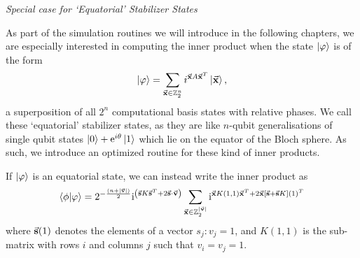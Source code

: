 \large{\itshape{Special case for `Equatorial' Stabilizer States}}\par
As part of the simulation routines we will introduce in the following chapters, we are especially interested in computing the inner product when the state $\ket{\varphi}$ is of the form
\[\ket{\varphi} = \sum_{\va{x}\in\mathbb{Z}_{2}^{n}}i^{\va{x}A\va{x}^{T}}\ket{\va{x}},\]
a superposition of all $2^{n}$ computational basis states with relative phases. We call these `equatorial' stabilizer states, as they are like $n$-qubit generalisations of single qubit states $\ket{0}+\mathrm{e}^{i\theta}\ket{1}$ which lie on the equator of the Bloch sphere. As such, we introduce an optimized routine for these kind of inner products.
\begin{cla}
If $\ket{\varphi}$ is an equatorial state, we can instead write the inner product as
\begin{equation}
\braket{\phi}{\varphi} = 2^{-\frac{(n+\vert \va{v}\vert)}{2}}\mathrm{i}^{\left(\va{s}K\va{s}^{T}+2\va{s}\cdot \va{v}\right)}\sum_{\va{x}\in\mathbb{Z}_{2}^{\vert \va{v}\vert}}\mathrm{i}^{\va{x}K(1,1)\va{x}^{T}+2\va{x}[\va{s}+\va{s}K](1)^{T}}
\end{equation}\label{claim:exp_sum_ip}
where $\va{s}(1)$ denotes the elements of a vector $s_{j}: v_{j}=1$, and $K(1,1)$ is the sub-matrix with rows $i$ and columns $j$ such that $v_{i}=v_{j}=1$. 
\end{cla}
